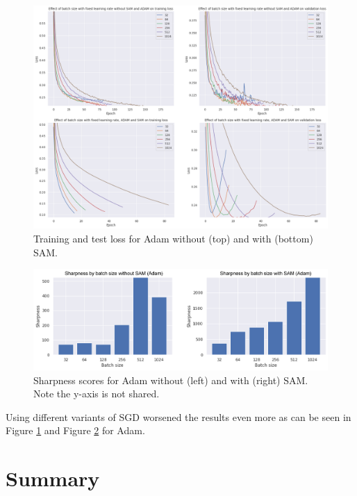 \documentclass[10pt,conference,compsocconf]{IEEEtran}
\begin{document}
\begin{figure}[tbp]
  \centering
  \includegraphics[width=\columnwidth]{img/figure3_val_loss_with_without_sam_adam}
  \caption{Training and test loss for Adam without (top) and with (bottom) SAM.}
  \vspace{-3mm}
  \label{fig:adam-val-loss-with-without}
\end{figure}
\begin{figure}[tbp]
  \centering
  \includegraphics[width=\columnwidth]{img/figure4_sharpness_with_without_sam_adam}
  \caption{Sharpness scores for Adam without (left) and with (right) SAM. Note the y-axis is not shared.}
  \vspace{-3mm}
  \label{fig:adam-sharpness-with-without}
\end{figure}
Using different variants of SGD worsened the results even more as can be seen in Figure \ref{fig:adam-val-loss-with-without} and Figure \ref{fig:adam-sharpness-with-without} for Adam.



\section{Summary}
\end{document}
